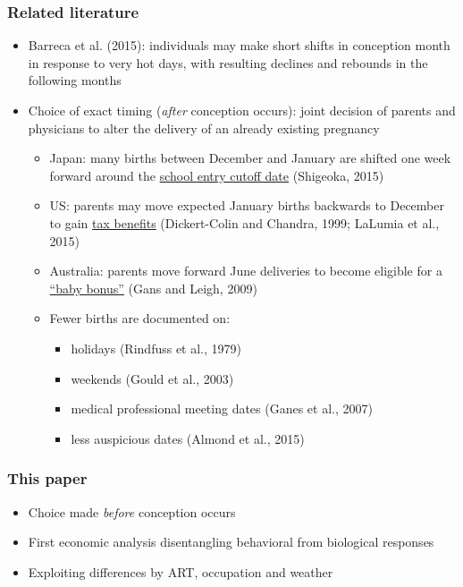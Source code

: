 \documentclass[10pt,letterpaper,subeqn]{beamer}
\begin{document}
\begin{frame}
\frametitle{Related literature}
\begin{itemize}
\item Barreca et al. (2015): individuals may make short shifts in conception month in response to very hot days, with resulting declines and rebounds in the following months
\item Choice of exact timing (\emph{after} conception occurs): joint decision of parents and physicians to alter the delivery of an already existing pregnancy
\begin{itemize}
\item Japan: many births between December and January are shifted one week forward around the \underline{school entry cutoff date} (Shigeoka, 2015)
\item US: parents may move expected January births backwards to December to gain \underline{tax benefits} (Dickert-Colin and Chandra, 1999; LaLumia et al., 2015)
\item Australia: parents move forward June deliveries to become eligible for a \underline{``baby bonus''} (Gans and Leigh, 2009)
\item Fewer births are documented on:
\begin{itemize}
\item holidays (Rindfuss et al., 1979)
\item weekends (Gould et al., 2003)
\item medical professional meeting dates (Ganes et al., 2007)
\item less auspicious dates (Almond et al., 2015)
\end{itemize}
\end{itemize}
\end{itemize}
\end{frame}

\begin{frame}
\frametitle{This paper}
\begin{itemize}
\item Choice made \emph{before} conception occurs
\item First economic analysis disentangling behavioral from biological responses
\item Exploiting differences by ART, occupation and weather
\end{itemize}
\end{frame}
\end{document}
